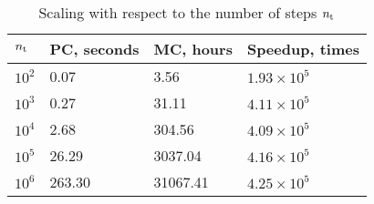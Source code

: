 \begin{table}[h]
  \vspace{-0.5em}
  \caption{Scaling with respect to the number of steps \textnormal{${n_\text{t}}$}}
  \vspace{-0.5em}
  \begin{tabular*}{1\linewidth}{L{40pt}R{50pt}R{50pt}R{60pt}}
    \toprule
    ${n_\text{t}}$ & PC, seconds & MC, hours & Speedup, times \\
    \midrule
    \midrule
    $10^2$ &   0.07 &     3.56 & $1.93 \times 10^5$ \\
    $10^3$ &   0.27 &    31.11 & $4.11 \times 10^5$ \\
    $10^4$ &   2.68 &   304.56 & $4.09 \times 10^5$ \\
    $10^5$ &  26.29 &  3037.04 & $4.16 \times 10^5$ \\
    $10^6$ & 263.30 & 31067.41 & $4.25 \times 10^5$ \\
    \bottomrule
  \end{tabular*}
  \vspace{-0.5em}
\end{table}
